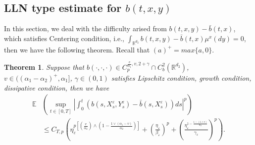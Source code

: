 \documentclass[11pt,reqno]{amsart}
\newtheorem{theorem}{\indent Theorem}[section]
\numberwithin{equation}{section}
\begin{document}
\subsection{LLN type estimate for $ b(t,x,y)$}


In this section, we deal with the difficulty arised from $b(t,x,y)-\bar{b}(t,x)$, which satisfies Centering condition, i.e., $\int_{\mathbb{R}^{d_{2}}}b(t,x,y)-\bar{b}(t,x)\mu^{x}(dy)=0$,  then we have the following theorem. Recall that $(a)^{+}=max\{a, 0\}$.
\begin{theorem}\label{T52}
	Suppose that $b(\cdot,\cdot,\cdot)\in C_{p}^{\frac{v}{\alpha_{1}},v, 2+\gamma}\cap C_{b}^{2}(\mathbb{R}^{d_{2}})$, $v\in((\alpha_{1}-\alpha_{2})^{+},\alpha_{1}]$, $\gamma\in(0,1)$ satisfies Lipschitz condition, growth condition, dissipative condition, then we have 
	\begin{equation}\label{5.44}
		\begin{split}
		\mathbb{E}&\left( \sup_{t\in [0,T]}\left| \int_{0}^{t}\left( b(s,X_{s}^{\varepsilon},Y_{s}^{\varepsilon})-\bar{b}(s,X_{s}^{\varepsilon})\right)ds\right|^{p} \right)\\
		&\leq  C_{T,p}\left(\eta_{\varepsilon}^{p\left[ \left( \frac{v}{\alpha_{2}}\right) \wedge \left( 1-\frac{1\vee(\alpha_{1}-v)}{\alpha_{2}}\right) \right] }+\left( \frac{\eta_{\varepsilon}}{\beta_{\varepsilon}}\right)^{p} + \left( \frac{\eta_{\varepsilon}^{1-\frac{1-(1\wedge v)}{\alpha_{2}}}}{\gamma_{\varepsilon}}\right)^{p}\right).
		\end{split}
	\end{equation}
\end{theorem}
\end{document}
